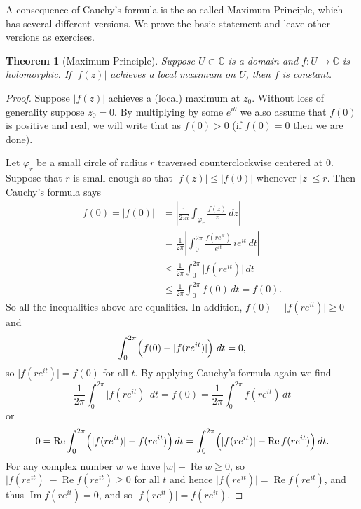 \documentclass[12pt,openany]{book}
\renewcommand{\Re}{\operatorname{Re}}
\renewcommand{\Im}{\operatorname{Im}}
\newcommand{\sabs}[1]{\lvert {#1} \rvert}
\newcommand{\abs}[1]{\left\lvert {#1} \right\rvert}
\newcommand{\C}{{\mathbb{C}}}
\theoremstyle{plain}
\newtheorem{thm}{Theorem}[section]
\theoremstyle{remark}
\theoremstyle{definition}
\theoremstyle{exercise}
\theoremstyle{example}
\begin{document}
A consequence of Cauchy's formula is the so-called Maximum Principle, which
has several different versions.  We prove the basic statement and leave
other versions as exercises.

\begin{thm}[Maximum Principle]
Suppose $U \subset \C$ is a domain and
$f \colon U \to \C$ is holomorphic.
If $\sabs{f(z)}$ achieves a local maximum on $U$, then $f$ is constant.
\end{thm}

\begin{proof}
Suppose $\sabs{f(z)}$ achieves a (local) maximum at $z_0$.
Without loss of generality suppose $z_0 = 0$.  By multiplying by some
$e^{i\theta}$ we also assume that $f(0)$ is positive and real, we will write
that as $f(0) > 0$ (if $f(0) = 0$ then we are done).

Let $\varphi_r$ be a small circle of radius $r$ traversed counterclockwise
centered at $0$.  Suppose that $r$ is small enough so that
$\sabs{f(z)} \leq \sabs{f(0)}$ whenever $\sabs{z} \leq r$.
Then Cauchy's formula says
\begin{equation*}
\begin{split}
f(0) = \sabs{f(0)} & =
\abs{\frac{1}{2\pi i}
\int_{\varphi_r}
\frac{f(z)}{z} \, dz
}
\\
& =
\frac{1}{2\pi}
\abs{
\int_0^{2\pi}
\frac{f(re^{it})}{e^{it}} \, i e^{it} \, dt
}
\\
& \leq
\frac{1}{2\pi}
\int_0^{2\pi}
\sabs{f(re^{it})}\, dt
\\
&
\leq
\frac{1}{2\pi}
\int_0^{2\pi}
f(0)\, dt = f(0) .
\end{split}
\end{equation*}
So all the inequalities above are equalities.
In addition, $f(0)-\sabs{f(re^{it})} \geq 0$ and
\begin{equation*}
\int_0^{2\pi}\Bigl( f(0)-\sabs{f(re^{it})} \Bigr) \ dt = 0 ,
\end{equation*}
so $\sabs{f(re^{it})} = f(0)$ for all $t$.
By applying Cauchy's formula
again we find
\begin{equation*}
\frac{1}{2\pi}
\int_0^{2\pi}
\sabs{f(re^{it})}\, dt
=
f(0)
=
\frac{1}{2\pi}
\int_0^{2\pi}
f(re^{it})\, dt
\end{equation*}
or
\begin{equation*}
0 =
\Re \int_0^{2\pi}
\Bigl(\sabs{f(re^{it})}-f(re^{it})\Bigr)\, dt
=
\int_0^{2\pi}
\Bigl(\sabs{f(re^{it})}-\Re f(re^{it})\Bigr)\, dt .
\end{equation*}
For any complex number $w$ we have $\sabs{w} - \Re w \geq 0$, so
$\sabs{f(re^{it})}-\Re f(re^{it}) \geq 0$ for all $t$ and hence
$\sabs{f(re^{it})}=\Re f(re^{it})$, and thus $\Im f(re^{it}) = 0$,
and so 
$\sabs{f(re^{it})}=f(re^{it})$.
\end{proof}
\end{document}
